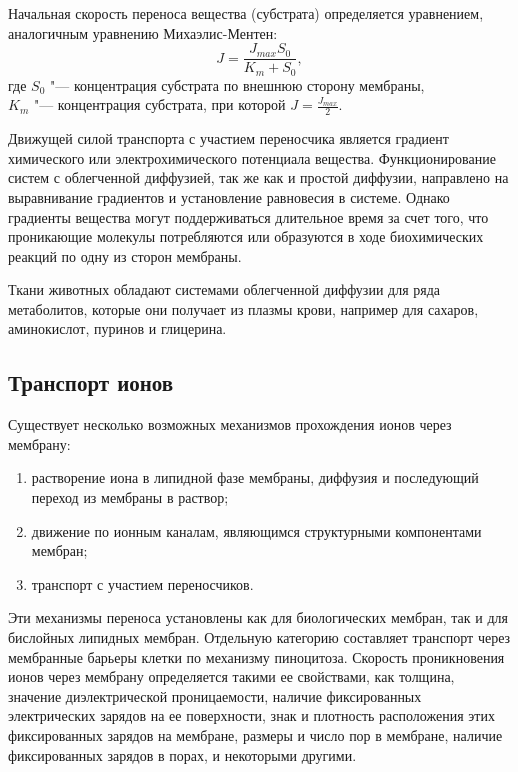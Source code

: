 \documentclass[12pt,a4paper,oneside]{book}
\begin{document}
Начальная скорость переноса вещества (субстрата) определяется уравнением, аналогичным уравнению Михаэлис-Ментен:
\begin{equation}
	J = \frac{J_{max}S_0}{K_m+S_0},
\end{equation}
где $S_0$ "--- концентрация субстрата по внешнюю сторону мембраны,\\
$K_m$ "--- концентрация субстрата, при которой $J=\frac{J_{max}}{2}$.

Движущей силой транспорта с участием переносчика является градиент химического или электрохимического потенциала вещества. Функционирование систем с облегченной диффузией, так же как и простой диффузии, направлено на выравнивание градиентов и установление равновесия в системе. Однако градиенты вещества могут поддерживаться длительное время за счет того, что проникающие молекулы потребляются или образуются в ходе биохимических реакций по одну из сторон мембраны. 

Ткани животных обладают системами облегченной диффузии для ряда метаболитов, которые они получает из плазмы крови, например для сахаров, аминокислот, пуринов и глицерина.

\subsection{Транспорт ионов}

Существует несколько возможных механизмов прохождения ионов через мембрану: 
\begin{enumerate}
\item растворение иона в липидной фазе мембраны, диффузия и последующий переход из мембраны в раствор; 
\item движение по ионным каналам, являющимся структурными компонентами мембран; 
\item транспорт с участием переносчиков. 
\end{enumerate}

Эти механизмы переноса установлены как для биологических мембран, так и для бислойных липидных мембран. Отдельную категорию составляет транспорт через мембранные барьеры клетки по механизму пиноцитоза. Скорость проникновения ионов через мембрану определяется такими ее свойствами, как толщина, значение диэлектрической проницаемости, наличие фиксированных электрических зарядов на ее поверхности, знак и плотность расположения этих фиксированных зарядов на мембране, размеры и число пор в мембране, наличие фиксированных зарядов в порах, и некоторыми другими. 
\end{document}
